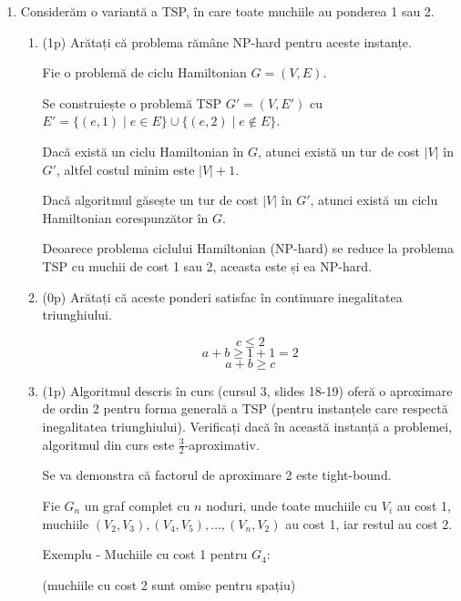 \documentclass[a4paper,12pt]{article}
\begin{document}
\begin{enumerate}

\item
Considerăm o variantă a TSP, în care toate muchiile au ponderea 1
sau 2.

\begin{enumerate}

\item (1p)
Arătați că problema rămâne NP-hard pentru aceste instanțe.

Fie o problemă de ciclu Hamiltonian $G = (V, E)$.

Se construiește o problemă TSP $G' = (V, E')$ cu $E' = \{(e, 1) \mid e \in E\} \cup \{(e, 2) \mid e \notin E\}$.

Dacă există un ciclu Hamiltonian în $G$, atunci există un tur de cost $|V|$ în $G'$,
altfel costul minim este $|V| + 1$.

Dacă algoritmul găsește un tur de cost $|V|$ în $G'$,
atunci există un ciclu Hamiltonian corespunzător în $G$.

Deoarece problema ciclului Hamiltonian (NP-hard) se reduce la problema TSP cu muchii de cost 1 sau 2,
aceasta este și ea NP-hard.

\item (0p)
Arătați că aceste ponderi satisfac în continuare inegalitatea triunghiului.

\[c \leq 2\]
\[a + b \geq 1 + 1 = 2\]
\[a + b \geq c\]

\item (1p)
Algoritmul descris în curs (cursul 3, slides 18-19) oferă o aproximare
de ordin 2 pentru forma generală a TSP (pentru instanțele care respectă
inegalitatea triunghiului). Verificați dacă în această instanță
a problemei, algoritmul din curs este $\frac{3}{2}$-aproximativ.

Se va demonstra că factorul de aproximare 2 este tight-bound.

Fie $G_n$ un graf complet cu $n$ noduri, unde toate muchiile cu $V_i$ au cost 1,
muchiile $(V_2, V_3), (V_4, V_5), \dots, (V_{n}, V_2)$ au cost 1, iar restul au cost 2.

\begin{center}
Exemplu - Muchiile cu cost 1 pentru $G_4$:

(muchiile cu cost 2 sunt omise pentru spațiu)

\end{center}


\end{enumerate}
\end{enumerate}
\end{document}
